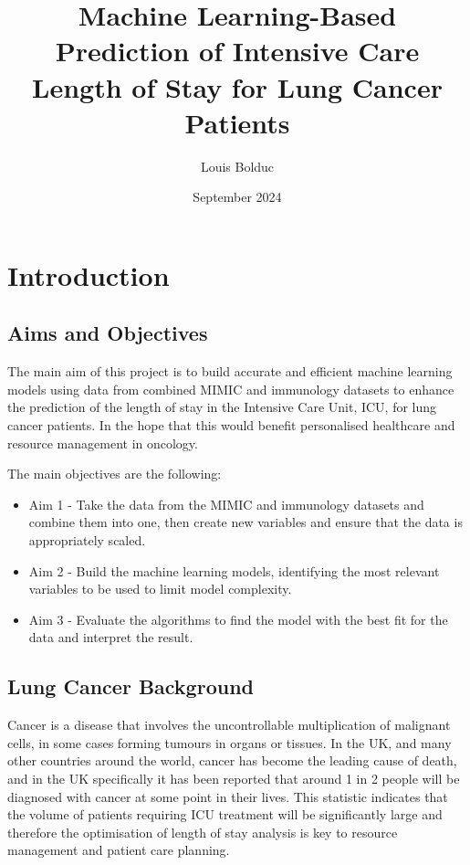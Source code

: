 \documentclass[11pt]{article}
\begin{document}
\title{Machine Learning-Based Prediction of Intensive Care Length of Stay for Lung Cancer Patients}
\author{Louis Bolduc}
\date{September 2024}

\maketitle
\tableofcontents
\pagebreak

\begin{abstract}
    
\end{abstract}

\renewcommand{\abstractname}{Acknowledgements}
\begin{abstract}
 
\end{abstract}

\section{Introduction}

\subsection{Aims and Objectives}
The main aim of this project is to build accurate and efficient machine learning models using data from combined MIMIC and immunology datasets to enhance the prediction of the length of stay in the Intensive Care Unit, ICU, for lung cancer patients. In the hope that this would benefit personalised healthcare and resource management in oncology.

The main objectives are the following:
\begin{itemize}
    \item Aim 1 - Take the data from the MIMIC and immunology datasets and combine them into one, then create new variables and ensure that the data is appropriately scaled.
    \item Aim 2 - Build the machine learning models, identifying the most relevant variables to be used to limit model complexity.
    \item Aim 3 - Evaluate the algorithms to find the model with the best fit for the data and interpret the result.
\end{itemize}

\subsection{Lung Cancer Background}
Cancer is a disease that involves the uncontrollable multiplication of malignant cells, in some cases forming tumours in organs or tissues. In the UK, and many other countries around the world, cancer has become the leading cause of death, and in the UK specifically it has been reported that around 1 in 2 people will be diagnosed with cancer at some point in their lives. This statistic indicates that the volume of patients requiring ICU treatment will be significantly large and therefore the optimisation of length of stay analysis is key to resource management and patient care planning.
\end{document}
